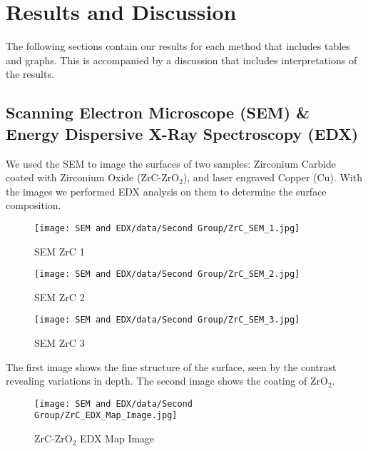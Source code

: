 \documentclass[11pt]{article}
\begin{document}
	
\clearpage

	\section{Results and Discussion}
	
	The following sections contain our results for each method that includes tables and graphs. This is accompanied by a discussion that includes interpretations of the results.
	
	\subsection{Scanning Electron Microscope (SEM) \& Energy Dispersive X-Ray Spectroscopy (EDX)}
	
	We used the SEM to image the surfaces of two samples: Zirconium Carbide coated with Zirconium Oxide (ZrC-ZrO$_2$), and laser engraved Copper (Cu). With the images we performed EDX analysis on them to determine the surface composition.
	
	
	\begin{figure}[!ht]
		\centering
		\begin{minipage}{0.33\textwidth}
			\centering
			\texttt{[image: SEM and EDX/data/Second Group/ZrC\_SEM\_1.jpg]}
			\caption{SEM ZrC 1}
			\label{fig:ZrC_SEM_1}
		\end{minipage}
		\begin{minipage}{0.33\textwidth}
			\centering
			\texttt{[image: SEM and EDX/data/Second Group/ZrC\_SEM\_2.jpg]}
			\caption{SEM ZrC 2}
			\label{fig:ZrC_SEM_2}
		\end{minipage}
		\begin{minipage}{0.33\textwidth}
			\centering
			\texttt{[image: SEM and EDX/data/Second Group/ZrC\_SEM\_3.jpg]}
			\caption{SEM ZrC 3}
			\label{fig:ZrC_SEM_3}
		\end{minipage}
	\end{figure}
	
	The first image shows the fine structure of the surface, seen by the contrast revealing variations in depth. The second image shows the coating of ZrO$_2$.
	
	\begin{figure}[!ht]
		\centering
		\texttt{[image: SEM and EDX/data/Second Group/ZrC\_EDX\_Map\_Image.jpg]}
		\caption{ZrC-ZrO$_2$ EDX Map Image}
		\label{fig:ZrC_EDX_Map_Image}
	\end{figure}
	
\end{document}

